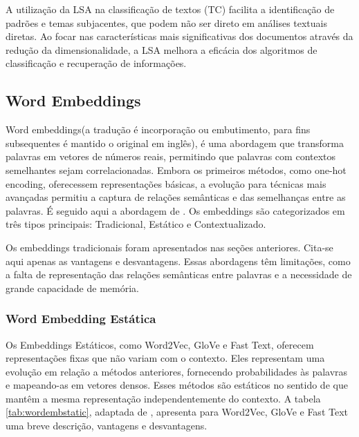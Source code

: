 A utilização da LSA na classificação de textos (TC) facilita a identificação de padrões e temas subjacentes, que podem não ser direto em análises textuais diretas. Ao focar nas características mais significativas dos documentos através da redução da dimensionalidade, a LSA melhora a eficácia dos algoritmos de classificação e recuperação de informações.

\subsection{Word Embeddings}

Word embeddings(a tradução é incorporação ou embutimento, para fins subsequentes é mantido o original em inglês), é uma abordagem que transforma palavras em vetores de números reais, permitindo que palavras com contextos semelhantes sejam correlacionadas. Embora os primeiros métodos, como one-hot encoding, oferecessem representações básicas, a evolução para técnicas mais avançadas permitiu a captura de relações semânticas e das semelhanças entre as palavras. É seguido aqui a abordagem de \cite{selva2021review}.  Os embeddings são categorizados em três tipos principais: Tradicional, Estático e Contextualizado.  

Os embeddings tradicionais foram apresentados nas seções anteriores.  Cita-se aqui apenas as vantagens e desvantagens.  Essas abordagens têm limitações, como a falta de representação das relações semânticas entre palavras e a necessidade de grande capacidade de memória.  

\subsubsection{Word Embedding Estática}

Os Embeddings Estáticos, como Word2Vec, GloVe e Fast Text, oferecem representações fixas que não variam com o contexto. Eles representam uma evolução em relação a métodos anteriores, fornecendo probabilidades às palavras e mapeando-as em vetores densos. Esses métodos são estáticos no sentido de que mantêm a mesma representação independentemente do contexto. A tabela \ref{tab:wordembstatic}, adaptada de \cite{selva2021review}, apresenta para Word2Vec, GloVe e Fast Text uma breve descrição, vantagens e desvantagens.

